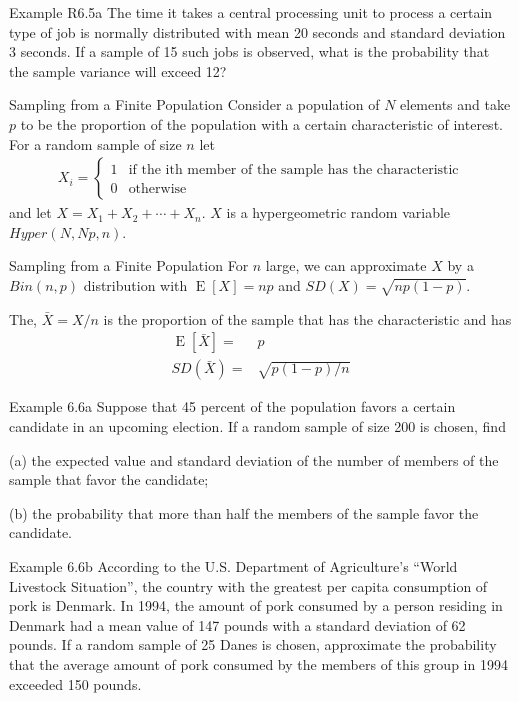 \documentclass{beamer}
\newcommand{\E}[1]{\operatorname{E}\left[#1\right]}
\begin{document}
\begin{frame}[t,shrink=10]{Example R6.5a}
  The time it takes a central processing unit to process a certain type of job
  is normally distributed with mean 20 seconds and standard deviation 3
  seconds. If a sample of 15 such jobs is observed, what is the probability that
  the sample variance will exceed 12?
\end{frame}
\begin{frame}{Sampling from a Finite Population}
  Consider a population of $N$ elements and take $p$ to be the proportion of the
  population with a certain characteristic of interest. For a random sample of
  size $n$ let
  \begin{align*}
    X_i =
    \begin{cases}
      1&\text{if the ith member of the sample has the characteristic}\\
      0&\text{otherwise}
    \end{cases}
  \end{align*}
  and let $X=X_1+X_2+\cdots+X_n$. $X$ is a hypergeometric random variable
  $Hyper(N,Np,n)$.
\end{frame}

\begin{frame}{Sampling from a Finite Population}
  For $n$ large, we can approximate $X$ by a $Bin(n,p)$ distribution with
  $\E{X}=np$ and $SD(X)=\sqrt{np(1-p)}$.

  The, $\bar{X}=X/n$ is the proportion of the sample that has the characteristic
  and has
  \begin{align*}
    \E{\bar{X}} =& p\\
    SD(\bar{X}) =& \sqrt{p(1-p)/n}
  \end{align*}
\end{frame}

\begin{frame}[t,shrink=10]{Example 6.6a}
  Suppose that 45 percent of the population favors a certain candidate in an
  upcoming election. If a random sample of size 200 is chosen, find

  (a) the expected value and standard deviation of the number of members of the
  sample that favor the candidate;

  (b) the probability that more than half the members of the sample favor the
  candidate.
\end{frame}

\begin{frame}[t,shrink=10]{Example 6.6b}
  According to the U.S. Department of Agriculture’s ``World Livestock
  Situation'', the country with the greatest per capita consumption of pork is
  Denmark. In 1994, the amount of pork consumed by a person residing in Denmark
  had a mean value of 147 pounds with a standard deviation of 62 pounds. If a
  random sample of 25 Danes is chosen, approximate the probability that the
  average amount of pork consumed by the members of this group in 1994 exceeded
  150 pounds.

\end{frame}
\end{document}
